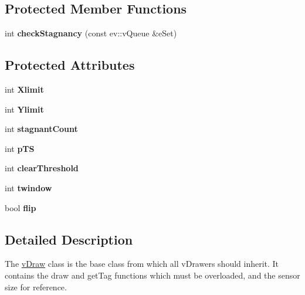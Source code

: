 \subsection*{Protected Member Functions}
\begin{DoxyCompactItemize}
\item 
int {\bfseries check\+Stagnancy} (const ev\+::v\+Queue \&e\+Set)\hypertarget{classvDraw_a844a978806965028d04bec676755bdd2}{}\label{classvDraw_a844a978806965028d04bec676755bdd2}

\end{DoxyCompactItemize}
\subsection*{Protected Attributes}
\begin{DoxyCompactItemize}
\item 
int {\bfseries Xlimit}\hypertarget{classvDraw_ae8b3fe947b98e624f5a3ec53e8f015b0}{}\label{classvDraw_ae8b3fe947b98e624f5a3ec53e8f015b0}

\item 
int {\bfseries Ylimit}\hypertarget{classvDraw_a5d0ce9dba294b4ce2f286fc940422e04}{}\label{classvDraw_a5d0ce9dba294b4ce2f286fc940422e04}

\item 
int {\bfseries stagnant\+Count}\hypertarget{classvDraw_acabdabb4ad106e6371c7f3b33a19da0e}{}\label{classvDraw_acabdabb4ad106e6371c7f3b33a19da0e}

\item 
int {\bfseries p\+TS}\hypertarget{classvDraw_abb5002dcf2203b5faf2eb2e05351deac}{}\label{classvDraw_abb5002dcf2203b5faf2eb2e05351deac}

\item 
int {\bfseries clear\+Threshold}\hypertarget{classvDraw_af06653835671aa513fffd31d26d99437}{}\label{classvDraw_af06653835671aa513fffd31d26d99437}

\item 
int {\bfseries twindow}\hypertarget{classvDraw_aae409af8476c3f61eb3157887dbde4ad}{}\label{classvDraw_aae409af8476c3f61eb3157887dbde4ad}

\item 
bool {\bfseries flip}\hypertarget{classvDraw_ac2fe76151dac6e58030f4954456b9246}{}\label{classvDraw_ac2fe76151dac6e58030f4954456b9246}

\end{DoxyCompactItemize}


\subsection{Detailed Description}
The \hyperlink{classvDraw}{v\+Draw} class is the base class from which all v\+Drawers should inherit. It contains the draw and get\+Tag functions which must be overloaded, and the sensor size for reference. 

